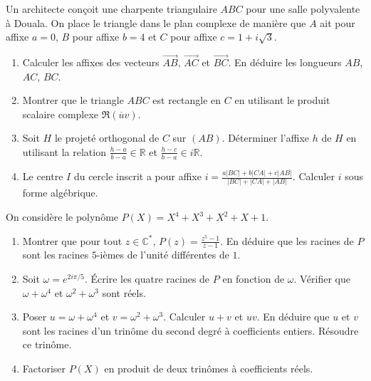 \documentclass[11pt]{article}
\begin{document}
\begin{exercice}
Un architecte conçoit une charpente triangulaire $ABC$ pour une salle polyvalente à Douala. On place le triangle dans le plan complexe de manière que $A$ ait pour affixe $a = 0$, $B$ pour affixe $b = 4$ et $C$ pour affixe $c = 1 + i\sqrt{3}$.
\begin{enumerate}
    \item Calculer les affixes des vecteurs $\overrightarrow{AB}$, $\overrightarrow{AC}$ et $\overrightarrow{BC}$. En déduire les longueurs $AB$, $AC$, $BC$.
    \item Montrer que le triangle $ABC$ est rectangle en $C$ en utilisant le produit scalaire complexe $\Re(\overline{u}v)$.
    \item Soit $H$ le projeté orthogonal de $C$ sur $(AB)$. Déterminer l'affixe $h$ de $H$ en utilisant la relation $\frac{h-a}{b-a} \in \mathbb{R}$ et $\frac{h-c}{b-a} \in i\mathbb{R}$.
    \item Le centre $I$ du cercle inscrit a pour affixe $i = \frac{a|BC| + b|CA| + c|AB|}{|BC|+|CA|+|AB|}$. Calculer $i$ sous forme algébrique.
\end{enumerate}
\end{exercice}

\begin{exercice}
On considère le polynôme $P(X) = X^4 + X^3 + X^2 + X + 1$.
\begin{enumerate}
    \item Montrer que pour tout $z \in \mathbb{C}^*$, $P(z) = \frac{z^5-1}{z-1}$. En déduire que les racines de $P$ sont les racines $5$-ièmes de l'unité différentes de $1$.
    \item Soit $\omega = e^{2i\pi/5}$. Écrire les quatre racines de $P$ en fonction de $\omega$. Vérifier que $\omega + \omega^4$ et $\omega^2 + \omega^3$ sont réels.
    \item Poser $u = \omega + \omega^4$ et $v = \omega^2 + \omega^3$. Calculer $u+v$ et $uv$. En déduire que $u$ et $v$ sont les racines d'un trinôme du second degré à coefficients entiers. Résoudre ce trinôme.
    \item Factoriser $P(X)$ en produit de deux trinômes à coefficients réels.
\end{enumerate}
\end{exercice}
\end{document}
